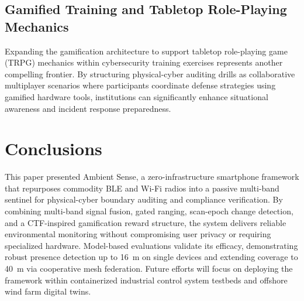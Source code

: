 \documentclass[journal,10pt]{IEEEtran}
\begin{document}
\subsection{Gamified Training and Tabletop Role-Playing Mechanics}
Expanding the gamification architecture to support tabletop role-playing game (TRPG) mechanics within cybersecurity training exercises represents another compelling frontier. By structuring physical-cyber auditing drills as collaborative multiplayer scenarios where participants coordinate defense strategies using gamified hardware tools, institutions can significantly enhance situational awareness and incident response preparedness.

\section{Conclusions}
This paper presented Ambient Sense, a zero-infrastructure smartphone framework that repurposes commodity BLE and Wi-Fi radios into a passive multi-band sentinel for physical-cyber boundary auditing and compliance verification. By combining multi-band signal fusion, gated ranging, scan-epoch change detection, and a CTF-inspired gamification reward structure, the system delivers reliable environmental monitoring without compromising user privacy or requiring specialized hardware. Model-based evaluations validate its efficacy, demonstrating robust presence detection up to 16~m on single devices and extending coverage to 40~m via cooperative mesh federation. Future efforts will focus on deploying the framework within containerized industrial control system testbeds and offshore wind farm digital twins.
\end{document}

